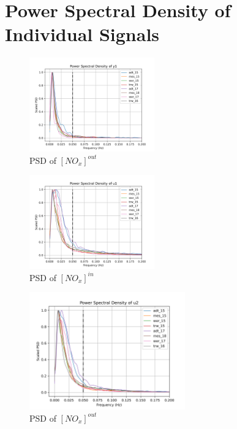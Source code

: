 \section{Power Spectral Density of Individual Signals}

\begin{multicols}{2}
       \begin{figure}[H]
        \centering
        \includegraphics[width=0.48\textwidth]{./figs/bfr_smth/truck_psd/y1.png}
        \caption{PSD of $[NO_x]^{out}$}
       \end{figure}

       \begin{figure}[H]
        \centering
        \includegraphics[width=0.48\textwidth]{./figs/bfr_smth/truck_psd/u1.png}
        \caption{PSD of $[NO_x]^{in}$}
       \end{figure}
\end{multicols}

\begin{figure}[H]
        \centering
        \includegraphics[width=0.6\textwidth]{./figs/bfr_smth/truck_psd/u2.png}
        \caption{PSD of $[NO_x]^{out}$}
\end{figure}

